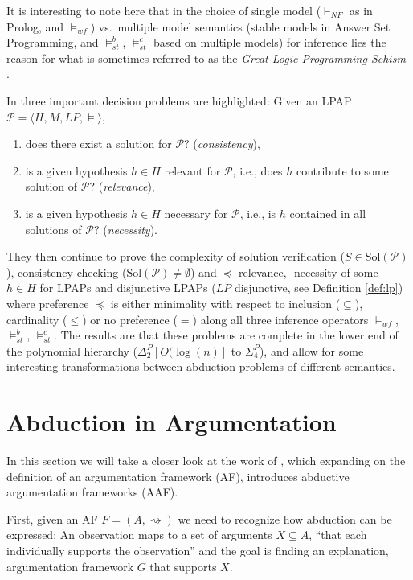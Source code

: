 \documentclass[a4paper]{article}
\newcommand{\problem}{\ensuremath{\mathscr{P}}}
\newcommand{\entails}{\models}
\newcommand{\sol}{\mathrm{Sol}}
\newcommand{\wf}{\ensuremath{\entails_{wf}}}
\newcommand{\brave}{\ensuremath{\entails_{st}^b}}
\newcommand{\caut}{\ensuremath{\entails_{st}^c}}
\newcommand{\sldnf}{\ensuremath{\vdash_{NF}}}
\newcommand{\attacks}{\rightsquigarrow}
\begin{document}
It is interesting to note here that in the choice of single model ($\sldnf$ as in Prolog, and $\wf$) vs.~multiple model semantics (stable models in Answer Set Programming, and $\brave$, $\caut$ based on multiple models) for inference lies the reason for what is sometimes referred to as the \emph{Great Logic Programming Schism} \cite[Section 3, p.~13]{DBLP:conf/rweb/2009}.

In \cite{DBLP:journals/tcs/EiterGL97} three important decision problems are highlighted: Given an LPAP $\problem = \langle H, M, LP, \entails \rangle$,\begin{enumerate} \setlength\itemsep{-1mm} \item does there exist a solution for $\problem$? (\emph{consistency}),
\item is a given hypothesis $h \in H$ relevant for $\problem$, i.e., does $h$ contribute to some solution of $\problem$? (\emph{relevance}),
\item is a given hypothesis $h \in H$ necessary for $\problem$, i.e., is $h$ contained in all solutions of $\problem$? (\emph{necessity}).
\end{enumerate}

They then continue to prove the complexity of solution verification ($S \in \sol(\problem)$), consistency checking ($\sol(\problem) \not = \emptyset$) and $\preceq$-relevance, -necessity of some $h \in H$ for LPAPs and disjunctive LPAPs ($LP$ disjunctive, see Definition \ref{def:lp}) where preference $\preceq$ is either minimality with respect to inclusion ($\subseteq$), cardinality ($\leq$) or no preference ($=$) along all three inference operators $\wf$, $\brave$, $\caut$. The results are that these problems are complete in the lower end of the polynomial hierarchy ($\Delta_2^P[O(\log(n)]$ to $\Sigma_4^P$), and allow for some interesting transformations between abduction problems of different semantics.

\section{Abduction in Argumentation}
\label{sec:aaf}

In this section we will take a closer look at the work of \citet{DBLP:conf/ecai/BoothGKRT14}, which expanding on the definition of an argumentation framework (AF), introduces abductive argumentation frameworks (AAF).

First, given an AF $F = (A, \attacks)$ we need to recognize how abduction can be expressed: An observation maps to a set of arguments $X \subseteq A$, \enquote{that each individually supports the observation} \cite[p.~118]{DBLP:conf/ecai/BoothGKRT14} and the goal is finding an explanation, argumentation framework $G$ that supports $X$.
\end{document}
